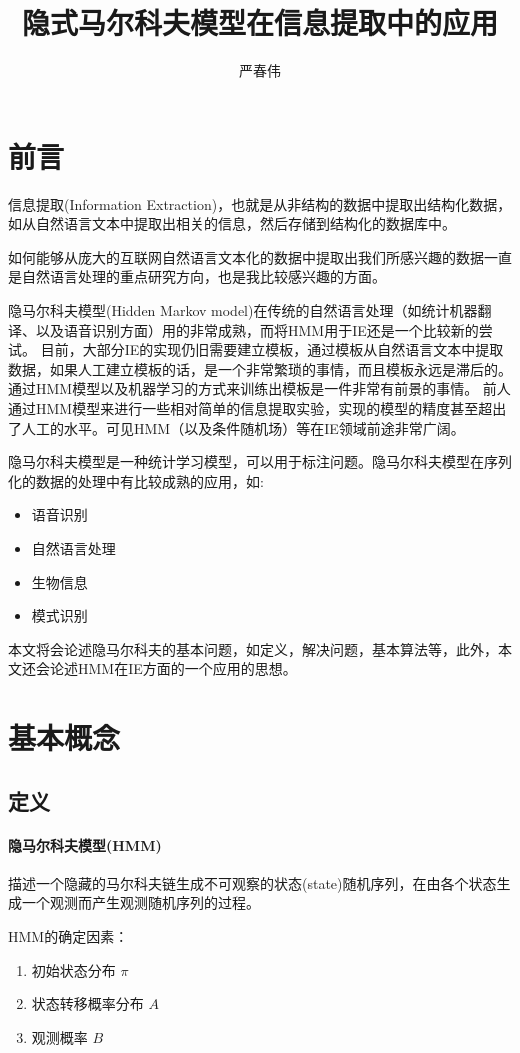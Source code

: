 \documentclass[a4paper]{ctexart}
\author{严春伟}
\title{隐式马尔科夫模型在信息提取中的应用}
\begin{document}
    \maketitle

\section{前言}
\par 信息提取(Information Extraction)，也就是从非结构的数据中提取出结构化数据，如从自然语言文本中提取出相关的信息，然后存储到结构化的数据库中。
\par 如何能够从庞大的互联网自然语言文本化的数据中提取出我们所感兴趣的数据一直是自然语言处理的重点研究方向，也是我比较感兴趣的方面。
\par 隐马尔科夫模型(Hidden Markov model)在传统的自然语言处理（如统计机器翻译、以及语音识别方面）用的非常成熟，而将HMM用于IE还是一个比较新的尝试。 目前，大部分IE的实现仍旧需要建立模板，通过模板从自然语言文本中提取数据，如果人工建立模板的话，是一个非常繁琐的事情，而且模板永远是滞后的。 通过HMM模型以及机器学习的方式来训练出模板是一件非常有前景的事情。 前人通过HMM模型来进行一些相对简单的信息提取实验，实现的模型的精度甚至超出了人工的水平。可见HMM（以及条件随机场）等在IE领域前途非常广阔。
\par 隐马尔科夫模型是一种统计学习模型，可以用于标注问题。隐马尔科夫模型在序列化的数据的处理中有比较成熟的应用，如:
\begin{itemize}
\item 语音识别
\item 自然语言处理
\item 生物信息
\item 模式识别
\end{itemize}
\par
本文将会论述隐马尔科夫的基本问题，如定义，解决问题，基本算法等，此外，本文还会论述HMM在IE方面的一个应用的思想。

\section{基本概念}
\subsection{定义}
\paragraph{隐马尔科夫模型(HMM)} 描述一个隐藏的马尔科夫链生成不可观察的状态(state)随机序列，在由各个状态生成一个观测而产生观测随机序列的过程。
\par
HMM的确定因素：
\begin{enumerate}
\item 初始状态分布 $\pi$
\item 状态转移概率分布 $A$
\item 观测概率 $B$
\end{enumerate}
\end{document}
